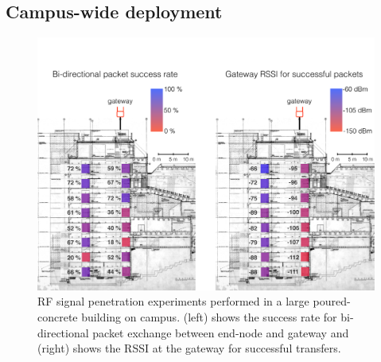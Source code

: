 \subsection{Campus-wide deployment}

\begin{figure}[!hbt]
\centering
\includegraphics[width=\columnwidth]{figures/penetration_test_wean_cropped}
\compactimg
\caption{RF signal penetration experiments performed in a large poured-concrete building on campus. (left) shows the success rate for bi-directional packet exchange between end-node and gateway and (right) shows the RSSI at the gateway for successful transfers.}
\label{fig:penetration}
\compactimg
\end{figure}





